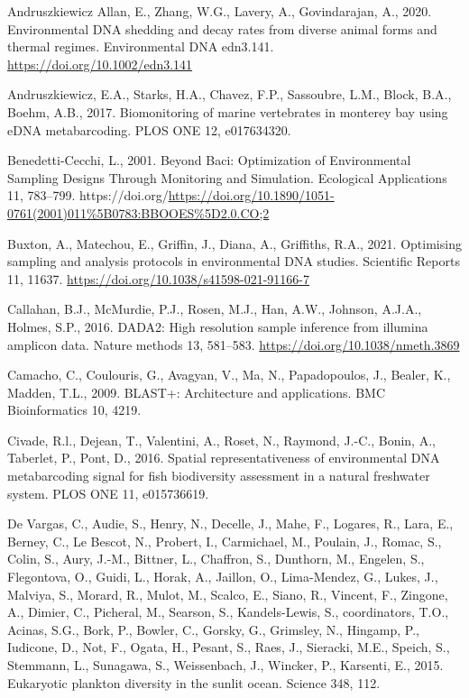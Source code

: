\documentclass[
]{article}
\newlength{\cslhangindent}
\newlength{\cslentryspacingunit} %
\newenvironment{CSLReferences}[2] %
 {%
  \setlength{\parindent}{0pt}
  \ifodd #1
  \let\oldpar\par
  \def\par{\hangindent=\cslhangindent\oldpar}
  \fi
  \setlength{\parskip}{#2\cslentryspacingunit}
 }%
 {}
\begin{document}
\hypertarget{refs}{}
\begin{CSLReferences}{1}{0}
\leavevmode{}%
Andruszkiewicz Allan, E., Zhang, W.G., Lavery, A., Govindarajan, A.,
2020. Environmental DNA shedding and decay rates from diverse animal
forms and thermal regimes. Environmental DNA edn3.141.
\url{https://doi.org/10.1002/edn3.141}

\leavevmode{}%
Andruszkiewicz, E.A., Starks, H.A., Chavez, F.P., Sassoubre, L.M.,
Block, B.A., Boehm, A.B., 2017. Biomonitoring of marine vertebrates in
monterey bay using eDNA metabarcoding. PLOS ONE 12, e017634320.

\leavevmode{}%
Benedetti-Cecchi, L., 2001. Beyond Baci: Optimization of Environmental
Sampling Designs Through Monitoring and Simulation. Ecological
Applications 11, 783--799.
https://doi.org/\url{https://doi.org/10.1890/1051-0761(2001)011\%5B0783:BBOOES\%5D2.0.CO;2}

\leavevmode{}%
Buxton, A., Matechou, E., Griffin, J., Diana, A., Griffiths, R.A., 2021.
Optimising sampling and analysis protocols in environmental DNA studies.
Scientific Reports 11, 11637.
\url{https://doi.org/10.1038/s41598-021-91166-7}

\leavevmode{}%
Callahan, B.J., McMurdie, P.J., Rosen, M.J., Han, A.W., Johnson, A.J.A.,
Holmes, S.P., 2016. DADA2: High resolution sample inference from
illumina amplicon data. Nature methods 13, 581--583.
\url{https://doi.org/10.1038/nmeth.3869}

\leavevmode{}%
Camacho, C., Coulouris, G., Avagyan, V., Ma, N., Papadopoulos, J.,
Bealer, K., Madden, T.L., 2009. BLAST+: Architecture and applications.
BMC Bioinformatics 10, 4219.

\leavevmode{}%
Civade, R.l., Dejean, T., Valentini, A., Roset, N., Raymond, J.-C.,
Bonin, A., Taberlet, P., Pont, D., 2016. Spatial representativeness of
environmental DNA metabarcoding signal for fish biodiversity assessment
in a natural freshwater system. PLOS ONE 11, e015736619.

\leavevmode{}%
De Vargas, C., Audie, S., Henry, N., Decelle, J., Mahe, F., Logares, R.,
Lara, E., Berney, C., Le Bescot, N., Probert, I., Carmichael, M.,
Poulain, J., Romac, S., Colin, S., Aury, J.-M., Bittner, L., Chaffron,
S., Dunthorn, M., Engelen, S., Flegontova, O., Guidi, L., Horak, A.,
Jaillon, O., Lima-Mendez, G., Lukes, J., Malviya, S., Morard, R., Mulot,
M., Scalco, E., Siano, R., Vincent, F., Zingone, A., Dimier, C.,
Picheral, M., Searson, S., Kandels-Lewis, S., coordinators, T.O.,
Acinas, S.G., Bork, P., Bowler, C., Gorsky, G., Grimsley, N., Hingamp,
P., Iudicone, D., Not, F., Ogata, H., Pesant, S., Raes, J., Sieracki,
M.E., Speich, S., Stemmann, L., Sunagawa, S., Weissenbach, J., Wincker,
P., Karsenti, E., 2015. Eukaryotic plankton diversity in the sunlit
ocean. Science 348, 112.


\end{CSLReferences}
\end{document}
